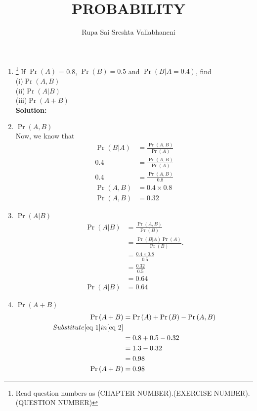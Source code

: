 \documentclass{article}
\newcommand{\solution}{\noindent \textbf{Solution: }}
\providecommand{\pr}[1]{\ensuremath{\Pr\left(#1\right)}}
\begin{document}
\title{PROBABILITY}
\author{\Large Rupa Sai Sreshta Vallabhaneni}
\date{}

\maketitle
\begin{enumerate}[label=13.\arabic{enumi}.\arabic{enumii}]%
\setcounter{enumi}{0}
\setcounter{enumii}{3}

\item \footnote{Read question numbers as (CHAPTER NUMBER).(EXERCISE NUMBER).(QUESTION NUMBER)}  If $\pr{A}$ = 0.8, $\pr{B} = 0.5$ and $\pr{B \vert A = 0.4}$, find  \\
(i)$\pr{A,B}$ 
\\
 (ii)$\pr{A \vert B}$
\\
 (iii)$\pr{A+B}$
\\[1ex]

\solution
\item $\pr{A,B}$
 \\
  Now, we know that
 \begin{align}
\pr{B \vert A} &= \frac{\pr{A , B}}{\pr{A}}
 \\
 0.4 &= \frac{\pr{A, B}}{\pr{A}}
 \\
 0.4 &= \frac{\pr{A, B}}{0.8}
 \\
 \pr{A,B} &= 0.4 \times 0.8
 \\
 \pr{A,B} &= 0.32
 \label{eq 1}
 \end{align}
 \item
 $\pr{A \vert B}$
 \begin{align}
 \pr{A \vert B} &= \frac{\pr{A,B}}{\pr{B}}
 \\
 &= \frac{\pr{ B \vert A}\pr{A}}{\pr{B}}.
 \\
  &= \frac{0.4 \times 0.8}{0.5}
 \\
 &= \frac{0.32}{0.5}
 \\
 &= 0.64
 \\
\pr{A \vert B} &= 0.64
 \end{align}
 \item
  $\pr{A+B}$
 \begin{align}
 \pr{A+B} &= \pr{A}+\pr{B}-\pr{A, B} 
 \label{eq 2}
 \\
 Substitute \eqref{eq 1}  in \eqref{eq 2}
 \\
 &=0.8+0.5-0.32
 \\
 &=1.3-0.32
 \\
 &= 0.98
 \\
 \pr{A+B} &= 0.98
 \end{align}
\end{enumerate}
\end{document}
